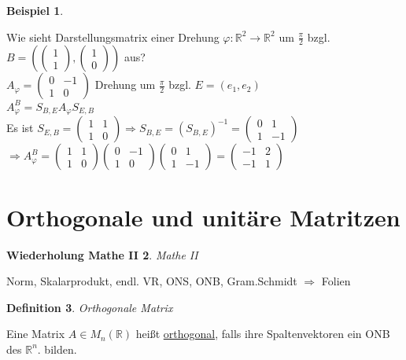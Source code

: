 \documentclass[a4paper,11pt]{article}
\newtheorem{definition}{Definition}[section]
\newtheorem{bsp}[definition]{Beispiel}
\newtheorem{wdh}[definition]{Wiederholung Mathe II}
\begin{document}
\begin{bsp}
\end{bsp}
Wie sieht Darstellungsmatrix einer Drehung $\varphi\colon\mathbb{R}^2\to\mathbb{R}^2$ um $\frac{\pi}{2}$ bzgl. $B=\left(\begin{pmatrix}1\\1\end{pmatrix},\begin{pmatrix}1\\0\end{pmatrix}\right)$ aus? \\
$A_\varphi=\begin{pmatrix}0 & -1 \\ 1 & 0\end{pmatrix}$ Drehung um $\frac{\pi}{2}$ bzgl. $E=(e_1,e_2)$ \\
$A^B_\varphi=S_{B,E}A_\varphi S_{E,B}$ \\
Es ist $S_{E,B}=\begin{pmatrix}1 & 1 \\ 1 & 0\end{pmatrix}\Rightarrow S_{B,E}=(S_{B,E})^{-1}=\begin{pmatrix}0 & 1 \\ 1 & -1\end{pmatrix}$ \\
$\Rightarrow A^B_\varphi=\begin{pmatrix}1 & 1 \\ 1 & 0\end{pmatrix}\begin{pmatrix}0 & -1 \\ 1 & 0\end{pmatrix}\begin{pmatrix}0 & 1 \\ 1 & -1\end{pmatrix}=\begin{pmatrix}-1 & 2 \\ -1 & 1\end{pmatrix}$

\newpage

\section{Orthogonale und unitäre Matritzen}

\begin{wdh}
	Mathe II
\end{wdh}
Norm, Skalarprodukt, endl. VR, ONS, ONB, Gram.Schmidt $\Rightarrow$ Folien


\begin{definition}
	Orthogonale Matrix
\end{definition}
Eine Matrix $A\in M_n(\mathbb{R})$ heißt \underline{orthogonal}, falls ihre Spaltenvektoren ein ONB des $\mathbb{R}^n$. bilden.
\end{document}
